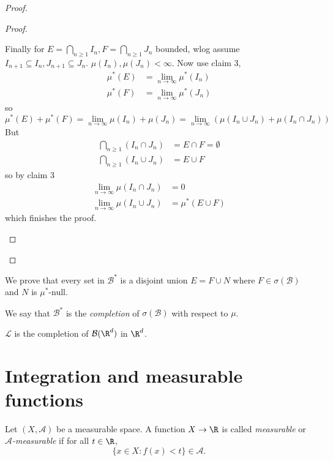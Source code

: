 \documentclass[a4paper]{article}
\begin{document}
\begin{proof}
\begin{proof}
\begin{enumerate}
      Finally for \(E = \bigcap_{n \geq 1} I_n, F = \bigcap_{n \geq 1} J_n\) bounded, wlog assume \(I_{n + 1} \subseteq I_n, J_{n + 1} \subseteq J_n\). \(\mu(I_n), \mu(J_n) < \infty\). Now use claim 3,
      \begin{align*}
        \mu^*(E) &= \lim_{n \to \infty} \mu^*(I_n) \\
        \mu^*(F) &= \lim_{n \to \infty} \mu^*(J_n)
      \end{align*}
      so
      \[
        \mu^*(E) + \mu^*(F)
        = \lim_{n \to \infty} \mu(I_n) + \mu(J_n)
        = \lim_{n \to \infty} (\mu(I_n \cup J_n) + \mu(I_n \cap J_n))
      \]
      But
      \begin{align*}
        \bigcap_{n \geq 1} (I_n \cap J_n) &= E \cap F = \emptyset \\
        \bigcap_{n \geq 1} (I_n \cup J_n) &= E \cup F
      \end{align*}
      so by claim 3
      \begin{align*}
        \lim_{n \to \infty} \mu(I_n \cap J_n) &= 0 \\
        \lim_{n \to \infty} \mu(I_n \cup J_n) &= \mu^*(E \cup F)
      \end{align*}
      which finishes the proof.
    \end{enumerate}
  \end{proof}
\end{proof}

\begin{remark}
  We prove that every set in \(\mathcal B^*\) is a disjoint union \(E = F \cup N\) where \(F \in \sigma(\mathcal B)\) and \(N\) is \(\mu^*\)-null.
\end{remark}

\begin{definition}[completion]
  We say that \(\mathcal B^*\) is the \emph{completion} of \(\sigma(\mathcal B)\) with respect to \(\mu\).
\end{definition}

\begin{eg}
  \(\mathcal L\) is the completion of \(\mathcal B(\R^d)\) in \(\R^d\).
\end{eg}

\section{Integration and measurable functions}

\begin{definition}
  Let \((X, \mathcal A)\) be a measurable space. A function \(X \to \R\) is called \emph{measurable} or \emph{\(\mathcal A\)-measurable} if for all \(t \in \R\),
  \[
    \{x \in X: f(x) < t\} \in \mathcal A.
  \]
\end{definition}
\end{document}
